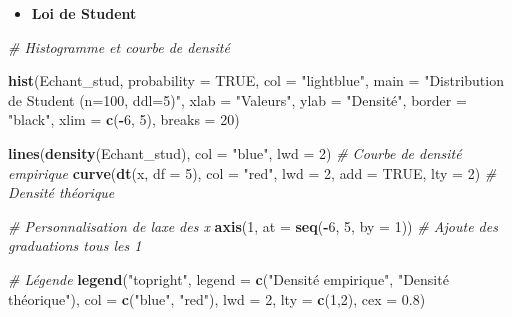 \documentclass[
  12pt,
]{article}
\newenvironment{Shaded}{\begin{snugshade}}{\end{snugshade}}
\newcommand{\AttributeTok}[1]{\textcolor[rgb]{0.13,0.29,0.53}{#1}}
\newcommand{\CommentTok}[1]{\textcolor[rgb]{0.56,0.35,0.01}{\textit{#1}}}
\newcommand{\ConstantTok}[1]{\textcolor[rgb]{0.56,0.35,0.01}{#1}}
\newcommand{\DecValTok}[1]{\textcolor[rgb]{0.00,0.00,0.81}{#1}}
\newcommand{\FloatTok}[1]{\textcolor[rgb]{0.00,0.00,0.81}{#1}}
\newcommand{\FunctionTok}[1]{\textcolor[rgb]{0.13,0.29,0.53}{\textbf{#1}}}
\newcommand{\NormalTok}[1]{#1}
\newcommand{\SpecialCharTok}[1]{\textcolor[rgb]{0.81,0.36,0.00}{\textbf{#1}}}
\newcommand{\StringTok}[1]{\textcolor[rgb]{0.31,0.60,0.02}{#1}}
\providecommand{\tightlist}{%
  \setlength{\itemsep}{0pt}\setlength{\parskip}{0pt}}
\begin{document}
\begin{itemize}
\tightlist
\item
  \textbf{Loi de Student}
\end{itemize}

\begin{Shaded}
\begin{Highlighting}[]
\CommentTok{\# Histogramme et courbe de densité}

\FunctionTok{hist}\NormalTok{(Echant\_stud, }\AttributeTok{probability =} \ConstantTok{TRUE}\NormalTok{, }\AttributeTok{col =} \StringTok{"lightblue"}\NormalTok{, }
     \AttributeTok{main =} \StringTok{"Distribution de Student (n=100, ddl=5)"}\NormalTok{,}
     \AttributeTok{xlab =} \StringTok{"Valeurs"}\NormalTok{, }\AttributeTok{ylab =} \StringTok{"Densité"}\NormalTok{, }\AttributeTok{border =} \StringTok{"black"}\NormalTok{,}
     \AttributeTok{xlim =} \FunctionTok{c}\NormalTok{(}\SpecialCharTok{{-}}\DecValTok{6}\NormalTok{, }\DecValTok{5}\NormalTok{), }\AttributeTok{breaks =} \DecValTok{20}\NormalTok{) }

\FunctionTok{lines}\NormalTok{(}\FunctionTok{density}\NormalTok{(Echant\_stud), }\AttributeTok{col =} \StringTok{"blue"}\NormalTok{, }\AttributeTok{lwd =} \DecValTok{2}\NormalTok{) }\CommentTok{\# Courbe de densité empirique}
\FunctionTok{curve}\NormalTok{(}\FunctionTok{dt}\NormalTok{(x, }\AttributeTok{df =} \DecValTok{5}\NormalTok{), }\AttributeTok{col =} \StringTok{"red"}\NormalTok{, }\AttributeTok{lwd =} \DecValTok{2}\NormalTok{, }\AttributeTok{add =} \ConstantTok{TRUE}\NormalTok{, }\AttributeTok{lty =} \DecValTok{2}\NormalTok{) }\CommentTok{\# Densité théorique}

\CommentTok{\# Personnalisation de l\textquotesingle{}axe des x}
\FunctionTok{axis}\NormalTok{(}\DecValTok{1}\NormalTok{, }\AttributeTok{at =} \FunctionTok{seq}\NormalTok{(}\SpecialCharTok{{-}}\DecValTok{6}\NormalTok{, }\DecValTok{5}\NormalTok{, }\AttributeTok{by =} \DecValTok{1}\NormalTok{))  }\CommentTok{\# Ajoute des graduations tous les 1}

\CommentTok{\# Légende}
\FunctionTok{legend}\NormalTok{(}\StringTok{"topright"}\NormalTok{, }\AttributeTok{legend =} \FunctionTok{c}\NormalTok{(}\StringTok{"Densité empirique"}\NormalTok{, }\StringTok{"Densité théorique"}\NormalTok{), }
       \AttributeTok{col =} \FunctionTok{c}\NormalTok{(}\StringTok{"blue"}\NormalTok{, }\StringTok{"red"}\NormalTok{), }\AttributeTok{lwd =} \DecValTok{2}\NormalTok{, }\AttributeTok{lty =} \FunctionTok{c}\NormalTok{(}\DecValTok{1}\NormalTok{,}\DecValTok{2}\NormalTok{), }\AttributeTok{cex =} \FloatTok{0.8}\NormalTok{)}
\end{Highlighting}
\end{Shaded}
\end{document}
